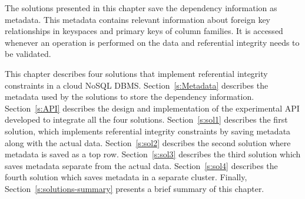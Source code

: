 The solutions presented in this chapter save the dependency information as
metadata. This metadata contains relevant  information about  foreign
key relationships in keyspaces and primary keys of column families. It is
accessed whenever an operation is performed on the data and referential
integrity needs to be validated.


This chapter describes  four  solutions  that implement referential
integrity constraints in a cloud \ac{NoSQL} \ac{DBMS}.
Section~\ref{s:Metadata} describes the metadata used by the solutions 
 to store the dependency information.
Section~\ref{s:API} describes the design and implementation of the experimental
API developed to integrate all the four
solutions. 
Section~\ref{s:sol1} describes  the first solution, which implements
referential integrity constraints by saving metadata along with the actual data.
Section~\ref{s:sol2} describes the second  solution where metadata is
saved as a top row. Section~\ref{s:sol3} describes the third   
solution which saves metadata separate from the actual data.   
Section~\ref{s:sol4}  describes the fourth solution which saves metadata in a separate cluster.
Finally, Section~\ref{s:solutions-summary} presents a brief summary of this
chapter. 

